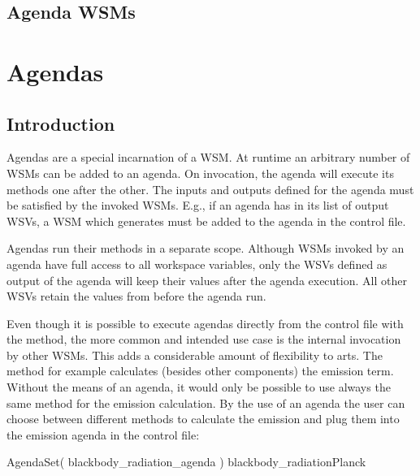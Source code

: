 \subsection{Agenda WSMs}

\section{Agendas}
\label{sec:agendas:agendas}

\subsection{Introduction}
Agendas are a special incarnation of a WSM. At runtime an arbitrary
number of WSMs can be added to an agenda. On invocation, the agenda
will execute its methods one after the other. The inputs and outputs
defined for the agenda must be satisfied by the invoked WSMs. E.g., if
an agenda has  in its list of output WSVs, a WSM
which generates  must be added to the agenda in the
control file.

Agendas run their methods in a separate scope. Although WSMs invoked by
an agenda have full access to all workspace variables, only the WSVs
defined as output of the agenda will keep their values after the agenda
execution. All other WSVs retain the values from before the agenda
run.

Even though it is possible to execute agendas directly from the control
file with the  method, the more common and
intended use case is the internal invocation by other WSMs. This adds a
considerable amount of flexibility to arts.
The  method for example calculates
(besides other components) the emission term. Without the means of an agenda,
it would only be possible to use always the same method for the emission
calculation. By the use of an agenda the user can choose between different
methods to calculate the emission and plug them into the emission agenda in
the control file:

\begin{code}
AgendaSet( blackbody\_radiation\_agenda ){
  blackbody\_radiationPlanck
}
\end{code}





